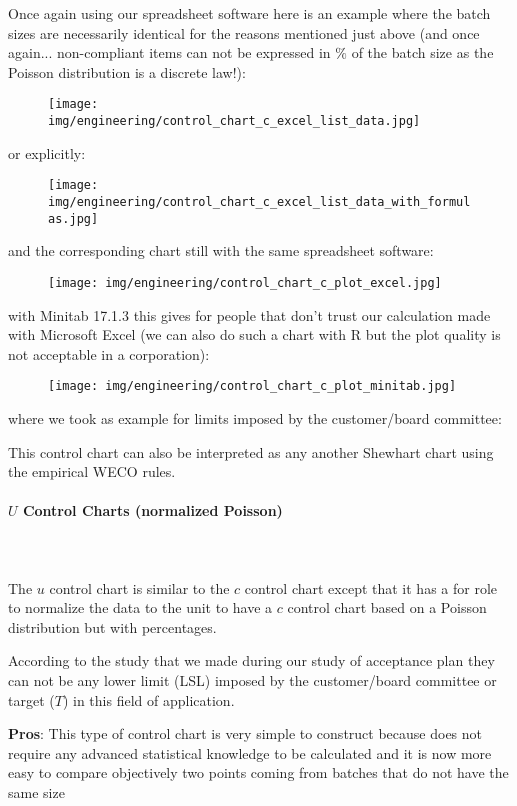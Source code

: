 		Once again using our spreadsheet software here is an example where the batch sizes are necessarily identical for the reasons mentioned just above (and once again... non-compliant items can not be expressed in $\%$ of the batch size as the Poisson distribution is a discrete law!):
	\begin{figure}[H]
		\centering
		\texttt{[image: img/engineering/control\_chart\_c\_excel\_list\_data.jpg]}
	\end{figure}
	or explicitly:
	\begin{figure}[H]
		\centering
		\texttt{[image: img/engineering/control\_chart\_c\_excel\_list\_data\_with\_formulas.jpg]}
	\end{figure}
	and the corresponding chart still with the same spreadsheet software:
	\begin{figure}[H]
		\centering
		\texttt{[image: img/engineering/control\_chart\_c\_plot\_excel.jpg]}
	\end{figure}
	with Minitab 17.1.3 this gives for people that don't trust our calculation made with Microsoft Excel (we can also do such a chart with R but the plot quality is not acceptable in a corporation):	
	\begin{figure}[H]
		\centering
		\texttt{[image: img/engineering/control\_chart\_c\_plot\_minitab.jpg]}
	\end{figure}
	where we took as example for limits imposed by the customer/board committee:
	

	This control chart can also be interpreted as any another Shewhart chart using the empirical WECO rules.
	
	\paragraph{$U$ Control Charts (normalized Poisson)}\mbox{}\\\\
	The $u$ control chart is similar to the $c$ control chart except that it has a for role to normalize the data to the unit to have a $c$ control chart based on a Poisson distribution but with percentages.

	According to the study that we made during our study of acceptance plan they can not be any lower limit (LSL) imposed by the customer/board committee or target ($T$) in this field of application.

	\textbf{Pros}: This type of control chart is very simple to construct because does not require any advanced statistical knowledge to be calculated and it is now more easy to compare objectively two points coming from batches that do not have the same size

